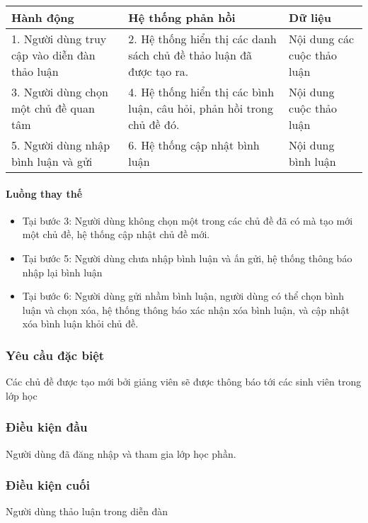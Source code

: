 \documentclass[./../main_file.tex]{subfiles}
\begin{document}
\begin{table}[H]
				\begin{tabular}{|p{.33\textwidth}|p{}|p{}|}
		\hline
		\textbf{Hành động}                  & \textbf{Hệ thống phản hồi}     & \textbf{Dữ liệu}   \\ \hline
		1. Người dùng truy cập vào diễn đàn thảo luận & 2. Hệ thống hiển thị các danh sách chủ đề thảo luận đã được tạo ra.    & Nội dung các cuộc thảo luận \\ \hline
		3. Người dùng chọn một chủ đề quan tâm        & 4. Hệ thống hiển thị các bình luận, câu hỏi, phản hồi trong chủ đề đó. & Nội dung cuộc thảo luận     \\ \hline
		5. Người dùng nhập bình luận và gửi & 6. Hệ thống cập nhật bình luận & Nội dung bình luận \\ \hline
	\end{tabular}
\end{table}

\paragraph{Luồng thay thế}
\begin{itemize}
	\item Tại bước 3: Người dùng không chọn một trong các chủ đề đã có mà tạo mới một chủ đề, hệ thống cập nhật chủ đề mới.
	\item Tại bước 5: Người dùng chưa nhập bình luận và ấn gửi, hệ thống thông báo nhập lại bình luận
	\item Tại bước 6: Người dùng gửi nhầm bình luận, người dùng có thể chọn bình luận và chọn xóa, hệ thống thông báo xác nhận xóa bình luận, và cập nhật xóa bình luận khỏi chủ đề.
	
\end{itemize}
\subsubsection{Yêu cầu đặc biệt}
Các chủ đề được tạo mới bởi giảng viên sẽ được thông báo tới các sinh viên trong lớp học

\subsubsection{Điều kiện đầu}
Người dùng đã đăng nhập và tham gia lớp học phần.

\subsubsection{Điều kiện cuối}
Người dùng thảo luận trong diễn đàn
\end{document}
